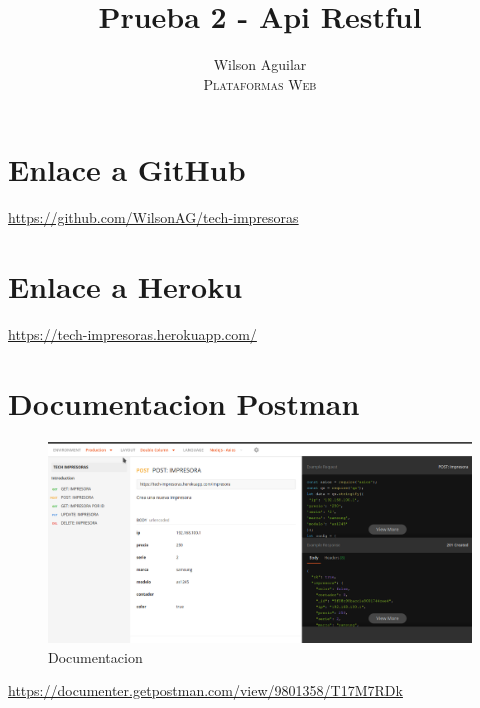 \documentclass[12pt]{article}
\title{Prueba 2 - Api Restful}
\author{
    Wilson Aguilar \\
    \textsc{Plataformas Web}
}
\begin{document}
\maketitle

\section{Enlace a GitHub}

\url{https://github.com/WilsonAG/tech-impresoras}

\section{Enlace a Heroku}

\url{https://tech-impresoras.herokuapp.com/}

\section{Documentacion Postman}

\begin{figure}[H]
  \centering
  \includegraphics[scale=.3]{assets/images/postman.png}
  \caption{Documentacion}

\end{figure}

\url{https://documenter.getpostman.com/view/9801358/T17M7RDk}
\end{document}

